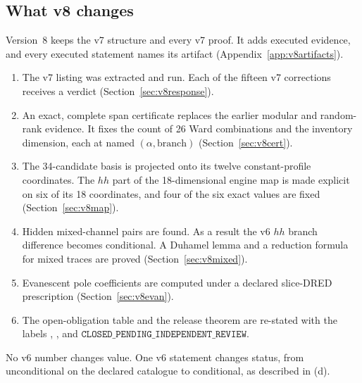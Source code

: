 
\subsection{What v8 changes}
\label{sec:whatv8}

Version~8 keeps the v7 structure and every v7 proof. It adds
executed evidence, and every executed statement names its
artifact (Appendix~\ref{app:v8artifacts}).
\begin{enumerate}[label=\textup{(\alph*)}]
\item The v7 listing was extracted and run. Each of the fifteen
v7 corrections receives a verdict
(Section~\ref{sec:v8response}).
\item An exact, complete span certificate replaces the earlier
modular and random-rank evidence. It fixes the count of 26 Ward
combinations and the inventory dimension, each at named
\((\alpha,\text{branch})\) (Section~\ref{sec:v8cert}).
\item The 34-candidate basis is projected onto its twelve
constant-profile coordinates. The \(hh\) part of the
18-dimensional engine map is made explicit on six of its 18
coordinates, and four of the six exact values are fixed
(Section~\ref{sec:v8map}).
\item Hidden mixed-channel pairs are found. As a result the v6
\(hh\) branch difference becomes conditional. A Duhamel lemma
and a reduction formula for mixed traces are proved
(Section~\ref{sec:v8mixed}).
\item Evanescent pole coefficients are computed under a declared
slice-DRED prescription (Section~\ref{sec:v8evan}).
\item The open-obligation table and the release theorem are
re-stated with the labels \OPEN, \PARTIAL, \CONDITIONAL{} and
\(\texttt{CLOSED\_PENDING\_INDEPENDENT\_REVIEW}\).
\end{enumerate}
No v6 number changes value. One v6 statement changes status, from
unconditional on the declared catalogue to conditional, as
described in (d).
